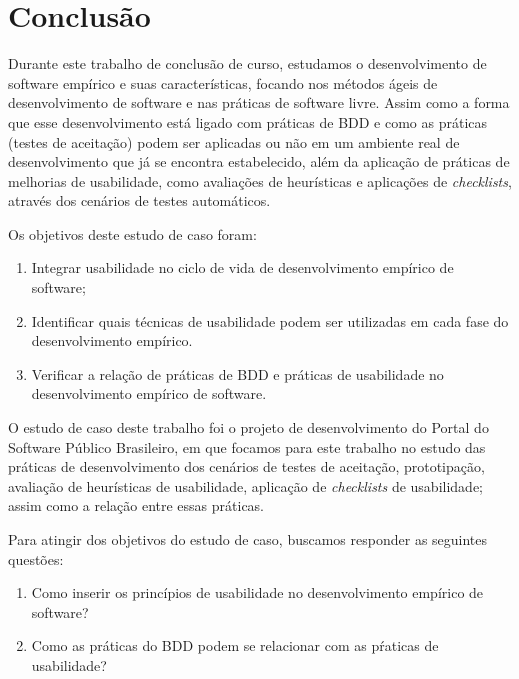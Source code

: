 \chapter{Conclusão}
\label{consideracoes-finais}

Durante este trabalho de conclusão de curso, estudamos o desenvolvimento de software empírico e suas características, focando nos métodos ágeis de desenvolvimento de software e nas práticas de software livre. Assim como a forma que esse desenvolvimento está ligado com práticas de BDD e como as práticas (testes de aceitação) podem ser aplicadas ou não em um ambiente real de desenvolvimento que já se encontra estabelecido, além da aplicação de práticas de melhorias de usabilidade, como avaliações de heurísticas e aplicações de \textit{checklists}, através dos cenários de testes automáticos.

Os objetivos deste estudo de caso foram:
\begin{enumerate}
\item Integrar usabilidade no ciclo de vida de desenvolvimento empírico de software;
\item Identificar quais técnicas de usabilidade  podem ser utilizadas em cada fase do desenvolvimento empírico.
\item Verificar a relação de práticas de BDD e práticas de usabilidade no desenvolvimento empírico de software.
\end{enumerate}

O estudo de caso deste trabalho foi o projeto de desenvolvimento do Portal do Software Público Brasileiro, em que focamos para este trabalho no estudo das práticas de desenvolvimento dos cenários de testes de aceitação, prototipação, avaliação de heurísticas de usabilidade, aplicação de \textit{checklists} de usabilidade; assim como a relação entre essas práticas.

Para atingir dos objetivos do estudo de caso, buscamos responder as seguintes questões:
\begin{enumerate}
\item Como inserir os princípios de usabilidade no desenvolvimento empírico de software?
\item Como as práticas do BDD podem se relacionar com as pŕaticas de usabilidade?
\end{enumerate}


